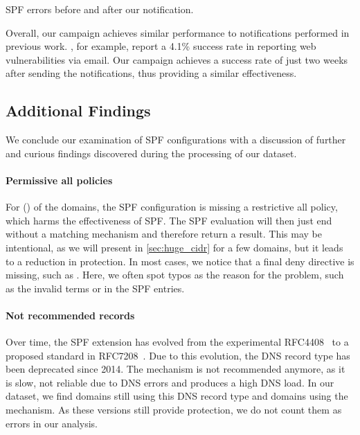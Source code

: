 \begin{table}[htbp]
\begin{threeparttable}
	\centering
	\caption{SPF errors before and after our notification. }
	\label{tab:notification_success} \small
	
 \end{threeparttable}
\end{table}

Overall, our campaign achieves similar performance to notifications performed in previous work.
\citet{Stock2016}, for example,  report a 4.1\% success rate in reporting web vulnerabilities via email. Our campaign achieves a success rate of \NotificationSuccess just two weeks after sending the notifications, thus providing a similar effectiveness. 








\subsection{Additional Findings}

We conclude our examination of SPF configurations with a discussion of further and curious findings discovered during the processing of our dataset.

\paragraph{Permissive all policies}
For \NoDenyAllPerc (\numprint{\NoDenyAll}) of the domains, the SPF configuration is missing a restrictive all policy, which harms the effectiveness of SPF.
The SPF evaluation will then just end without a matching mechanism and therefore return a  result.
This may be intentional, as we will present in \autoref{sec:huge_cidr} for a few domains, but it leads to a reduction in protection.
In most cases, we notice that a final deny directive is missing, such as .
Here, we often spot typos as the reason for the problem, such as the invalid terms  or  in the SPF entries.





\paragraph{Not recommended records}
Over time, the SPF extension has evolved from the experimental RFC4408~\cite{rfc4408} to a proposed standard in RFC7208~\cite{rfc7208}.
Due to this evolution, the DNS record type  has been deprecated since 2014.
The  mechanism is not recommended anymore, as it is slow, not reliable due to DNS errors and produces a high DNS load. 
In our dataset, we find \numprint{\DeprecatedSPFDomains} domains still using this DNS record type and \numprint{\DeprecatedPTRDomains} domains using the  mechanism. As these versions still provide protection, we do not count them as errors in our analysis.



